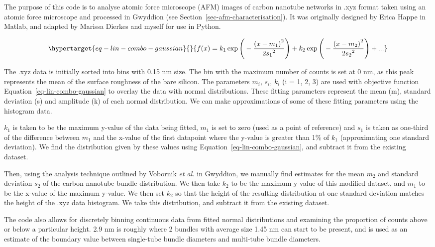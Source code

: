\documentclass[
  a4paper,
]{scrbook}
\begin{document}
The purpose of this code is to analyse atomic force microscope (AFM)
images of carbon nanotube networks in .xyz format taken using an atomic
force microscope and processed in Gwyddion (see
Section~\ref{sec-afm-characterisation}). It was originally designed by
Erica Happe in Matlab, and adapted by Marissa Dierkes and myself for use
in Python.

\begin{equation}\protect\hypertarget{eq-lin-combo-gaussian}{}{
f(x) = k_1\exp{\Bigg(-\frac{{(x-m_1)}^{2}}{{2s_1}^{2}}\Bigg)} + k_2\exp{\Bigg(-\frac{{(x-m_2)}^{2}}{{2s_2}^{2}}\Bigg)} + ...
}\label{eq-lin-combo-gaussian}\end{equation}

The .xyz data is initially sorted into bins with 0.15 nm size. The bin
with the maximum number of counts is set at 0 nm, as this peak
represents the mean of the surface roughness of the bare silicon. The
parameters \(m_i\), \(s_i\), \(k_i\) (i = 1, 2, 3) are used with
objective function Equation~\ref{eq-lin-combo-gaussian} to overlay the
data with normal distributions. These fitting parameters represent the
mean (m), standard deviation (s) and amplitude (k) of each normal
distribution. We can make approximations of some of these fitting
parameters using the histogram data.

\(k_1\) is taken to be the maximum y-value of the data being fitted,
\(m_1\) is set to zero (used as a point of reference) and \(s_1\) is
taken as one-third of the difference between \(m_1\) and the x-value of
the first datapoint where the y-value is greater than 1\% of \(k_1\)
(approximating one standard deviation). We find the distribution given
by these values using Equation~\ref{eq-lin-combo-gaussian}, and subtract
it from the existing dataset.

Then, using the analysis technique outlined by Vobornik \emph{et al.}
\autocite{Vobornik2023} in Gwyddion, we manually find estimates for the
mean \(m_2\) and standard deviation \(s_2\) of the carbon nanotube
bundle distribution. We then take \(k_2\) to be the maximum y-value of
this modified dataset, and \(m_1\) to be the x-value of the maximum
y-value. We then set \(k_2\) so that the height of the resulting
distribution at one standard deviation matches the height of the .xyz
data histogram. We take this distribution, and subtract it from the
existing dataset.

The code also allows for discretely binning continuous data from fitted
normal distributions and examining the proportion of counts above or
below a particular height. 2.9 nm is roughly where 2 bundles with
average size 1.45 nm can start to be present, and is used as an estimate
of the boundary value between single-tube bundle diameters and
multi-tube bundle diameters.
\end{document}
